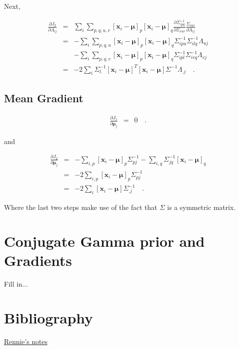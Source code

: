 \documentclass[letterpaper,12pt]{article}
\newcommand{\vect}[1]{\boldsymbol{#1}}
\newcommand{\data}{\vect{x}}
\newcommand{\mean}{\vect{\mu}}
\begin{document}
Next,

\begin{eqnarray}\displaystyle
\frac{\partial J_2}{\partial \Lambda_{lj}} &=&  \sum_i \sum_{p,q,u,v}
[\data_i-\mean]_p [\data_i-\mean]_q\frac{\partial \Sigma^{-1}_{ipq}}{\partial
  \Sigma_{iuv}}\frac{\Sigma_{iuv}}{\partial \Lambda_{lj}} \\
&=& - \sum_i \sum_{p,q,u} [\data_i-\mean]_p [\data_i-\mean]_q
\Sigma^{-1}_{ipu}\Sigma^{-1}_{ilq}\Lambda_{uj} \\
&&  - \sum_i \sum_{p,q,v} [\data_i-\mean]_p [\data_i-\mean]_q
\Sigma^{-1}_{ipl}\Sigma^{-1}_{ivq}\Lambda_{vj} \\
&=& -2 \sum_i \Sigma_{l.}^{-1}[\data_i-\mean]^T [\data_i-\mean]\Sigma^{-1}\Lambda_{.j}
\quad .
\label{eqn:gradlambda2}
\end{eqnarray}

\subsection{Mean Gradient}

\begin{eqnarray}\displaystyle
\frac{\partial J_1}{\partial \mean_{j}} &=&  0
\quad .
\label{eqn:gradmean1}
\end{eqnarray}

and 

\begin{eqnarray}\displaystyle
\frac{\partial J_2}{\partial \mean_{j}} &=&  -\sum_{i,p}
[\data_i-\mean]_p\Sigma_{pj}^{-1}  -\sum_{i,q}
\Sigma_{jq}^{-1} [\data_i-\mean]_q \\
&=&  -2 \sum_{i,p} [\data_i-\mean]_p\Sigma_{pj}^{-1} \\
&=& -2 \sum_i [\data_i-\mean] \Sigma_{.j}^{-1}
\quad .
\label{eqn:gradmean2}
\end{eqnarray}

Where the last two steps make use of the fact that $\Sigma$ is a
symmetric matrix.

\section{Conjugate Gamma prior and Gradients}

Fill in...

\section{Bibliography}

\href{http://bit.ly/11JqOFK}{Rennie's notes}
\end{document}
